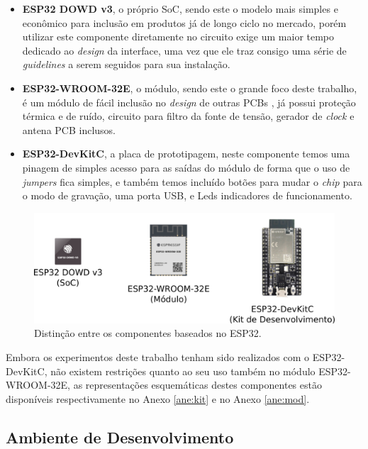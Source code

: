 \begin{itemize}
    \item \textbf{ESP32 DOWD v3}, o próprio \ac{SoC}, sendo este o modelo mais simples e econômico para inclusão em produtos já de longo ciclo no 
    mercado, porém utilizar este componente diretamente no circuito exige um maior tempo dedicado ao \textit{design} da interface, uma 
    vez que ele traz consigo uma série de \textit{guidelines} a serem seguidos para sua instalação. \cite{datasheet-soc}
    \item \textbf{ESP32-WROOM-32E}, o módulo, sendo este o grande foco deste trabalho, é um módulo de fácil inclusão no \textit{design} de outras PCBs   
    , já possui proteção térmica e de ruído, circuito para filtro da fonte de tensão, gerador de \textit{clock} e antena PCB inclusos. \cite{datasheet-modulo}
    \item \textbf{ESP32-DevKitC}, a placa de prototipagem, neste componente temos uma pinagem de simples acesso para as saídas do módulo de forma 
    que o uso de \textit{jumpers} fica simples, e também temos incluído botões para mudar o \textit{chip} para o modo de gravação, uma porta USB, e
    Leds indicadores de funcionamento.
\end{itemize}

\begin{figure}[htb]
    \begin{center}
	    \includegraphics[scale=0.5]{figs/esp32-familia.png}
	\end{center}
	\caption{\label{fig:esp-fam} Distinção entre os componentes baseados no ESP32.} 
\end{figure}

Embora os experimentos deste trabalho tenham sido realizados com o ESP32-DevKitC, não existem restrições quanto ao seu uso também no módulo
ESP32-WROOM-32E, as representações esquemáticas destes componentes estão disponíveis respectivamente no Anexo \ref{ane:kit} e no Anexo \ref{ane:mod}.

\subsection{Ambiente de Desenvolvimento}

